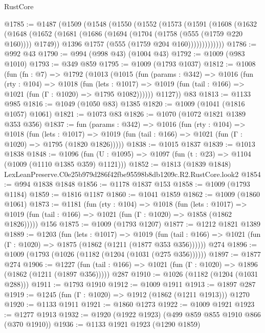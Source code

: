 \begin{lexlean}{RustCore}
\begin{coremodule}
@1785 := @1487
    (@1509
      (@1548
        (@1550
          (@1552
            (@1573
              (@1591
                (@1608
                  (@1632
                    (@1648
                      (@1652
                        (@1681
                          (@1686 (@1694 (@1704 (@1758 (@555 (@1759 @220 @160)))) @1749))
                          @1396
                          @1757
                          (@555 (@1759 @204 @160)))))))))))))
@1786 := @992 @43
@1790 := @994 (@998 @43) (@1004 @43)
@1792 := @1009 (@983 @1010)
@1793 := @349 @859
@1795 := @1009 (@1793 @1037)
@1812 := @1008
    (fun (fn : @7) =>
    @1792
      (@1013
        (@1015
          (fun (params : @342) =>
          @1016
            (fun (rty : @104) =>
            @1018
              (fun (lets : @1017) =>
              @1019 (fun (tail : @166) => @1021 (fun (Γ : @1020) => @1795 @1082))))))
        @1127))
    @83
@1813 := @1133 @985
@1816 := @1049 (@1050 @83) @1385
@1820 := @1009 (@1041 (@1816 @1057) @1061)
@1821 := @1073 @83
@1826 := @1070 (@1072 @1821 @1389 @353 @356)
@1837 := fun (params : @342) =>
  @1016
    (fun (rty : @104) =>
    @1018
      (fun (lets : @1017) =>
      @1019 (fun (tail : @166) => @1021 (fun (Γ : @1020) => @1795 (@1820 @1826)))))
@1838 := @1015 @1837
@1839 := @1013 @1838
@1848 := @1096 (fun (U : @1095) => @1097 (fun (t : @23) => @1104 (@1009 (@1110 @1385 @359) @1121)))
@1852 := @1813 (@1839 @1848) LexLeanPreserve.C0e25b979d286f42fbe95598b8db1209c.R2.RustCore.look2
@1854 := @994 @1838 @1848
@1856 := @1178 @1837 @153
@1858 := @1009 (@1793 @1184)
@1859 := @1816 @1187
@1860 := @1041 @1859
@1862 := @1009 (@1860 @1061)
@1873 := @1181
    (fun (rty : @104) =>
    @1018
      (fun (lets : @1017) =>
      @1019 (fun (tail : @166) => @1021 (fun (Γ : @1020) => @1858 (@1862 @1826)))))
    @156
@1875 := @1009 (@1793 @1207)
@1877 := @1212 @1821 @1389
@1889 := @1203
    (fun (lets : @1017) =>
    @1019 (fun (tail : @166) => @1021 (fun (Γ : @1020) => @1875 (@1862 (@1211 (@1877 @353 @356))))))
    @274
@1896 := @1009 (@1793 (@1026 (@1182 (@1204 (@1031 (@275 @356))))))
@1897 := @1877 @274
@1906 := @1227
    (fun (tail : @166) => @1021 (fun (Γ : @1020) => @1896 (@1862 (@1211 (@1897 @356)))))
    @287
@1910 := @1026 (@1182 (@1204 (@1031 @288)))
@1911 := @1793 @1910
@1912 := @1009 @1911
@1913 := @1897 @287
@1919 := @1245 (fun (Γ : @1020) => @1912 (@1862 (@1211 @1913))) @1270
@1920 := @1133 @1911
@1921 := @1860 @1273
@1922 := @1009 @1921
@1923 := @1277 @1913
@1932 := @1920 (@1922 @1923) (@499 @859 @855 @1910 @866 (@370 @1910))
@1936 := @1133 @1921 @1923 (@1290 @1859)

\end{coremodule}
\end{lexlean}
